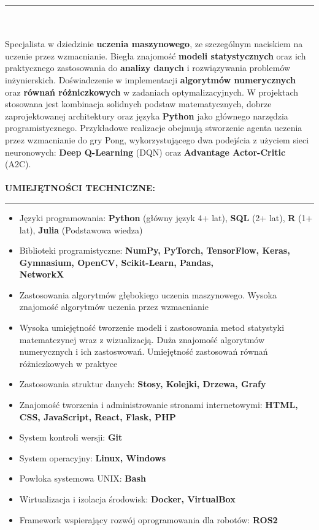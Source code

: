 \documentclass[10pt]{article}
\newcommand{\longline}{\rule{19.6cm}{1pt}}
\begin{document}
\noindent \longline 
\\ \\
\noindent Specjalista w dziedzinie \textbf{uczenia maszynowego}, ze szczególnym naciskiem na uczenie przez wzmacnianie.
Biegła znajomość \textbf{modeli statystycznych} oraz ich praktycznego zastosowania do \textbf{analizy danych} i rozwiązywania problemów inżynierskich.
Doświadczenie w implementacji \textbf{algorytmów numerycznych} oraz \textbf{równań różniczkowych} w zadaniach optymalizacyjnych.
W projektach stosowana jest kombinacja solidnych podstaw matematycznych, dobrze zaprojektowanej architektury oraz języka \textbf{Python} jako głównego narzędzia programistycznego. 
Przykładowe realizacje obejmują stworzenie agenta uczenia przez wzmacnianie do gry Pong, wykorzystującego dwa podejścia z użyciem sieci neuronowych: \textbf{Deep Q-Learning} (DQN) oraz \textbf{Advantage Actor-Critic} (A2C).
\\ \\
\noindent \fontsize{14pt}{14pt}\selectfont \textbf{\color{Violet}UMIEJĘTNOŚCI TECHNICZNE:}
\fontsize{10pt}{10pt}\selectfont 
\\ 
\noindent \longline 
\begin{itemize}[leftmargin=*, parsep=0.5pt]
    \item Języki programowania: \textbf{Python} (główny język 4+ lat), \textbf{SQL} (2+ lat), \textbf{R} (1+ lat), \textbf{Julia} (Podstawowa wiedza)
    \item Biblioteki programistyczne: \textbf{NumPy, PyTorch, TensorFlow, Keras, Gymnasium, OpenCV, Scikit-Learn, Pandas, \\ NetworkX}
    \item Zastosowania algorytmów głębokiego uczenia maszynowego. Wysoka znajomość algorytmów uczenia przez wzmacnianie
    \item Wysoka umiejętność tworzenie modeli i zastosowania metod statystyki matematczynej wraz z wizualizacją. 
    Duża znajomość algorytmów numerycznych i ich zastoswowań. Umiejętność zastosowań równań różniczkowych w praktyce
    \item Zastosowania struktur danych: \textbf{Stosy, Kolejki, Drzewa, Grafy}
    \item Znajomość tworzenia i administrowanie stronami internetowymi: \textbf{HTML, CSS, JavaScript, React, Flask, PHP}
    \item System kontroli wersji: \textbf{Git}
    \item System operacyjny: \textbf{Linux, Windows}
    \item Powłoka systemowa UNIX: \textbf{Bash} 
    \item Wirtualizacja i izolacja środowisk: \textbf{Docker, VirtualBox}
    \item Framework wspierający rozwój oprogramowania dla robotów: \textbf{ROS2}
\end{itemize}
\end{document}

